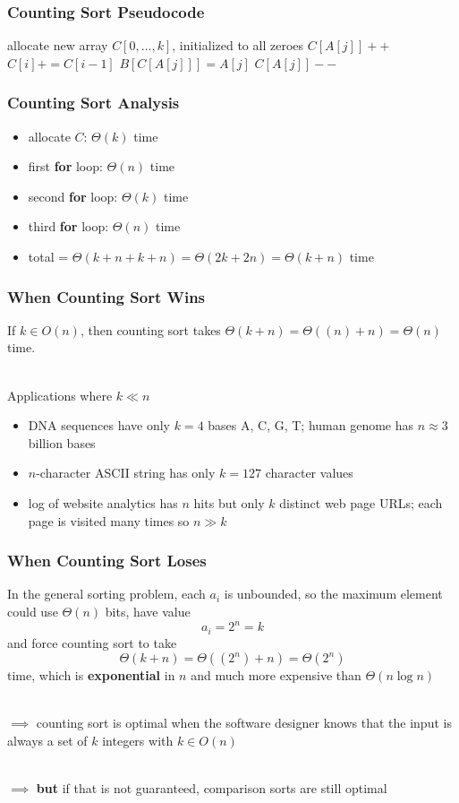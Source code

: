 \documentclass{beamer}
\newcommand{\stanza}{ \\~\ }
\begin{document}
\begin{frame} \frametitle{Counting Sort Pseudocode}
  \begin{algorithmic}[1]
    \State allocate new array $C[0, \ldots, k]$, initialized to all zeroes
      \State $C[A[j]]++$ 
    \EndFor
      \State $C[i] += C[i-1]$ 
    \EndFor
      \State $B[C[A[j]]] = A[j]$
      \State $C[A[j]]--$
    \EndFor
    \EndFunction
  \end{algorithmic}
\end{frame}

\begin{frame} \frametitle{Counting Sort Analysis}
\begin{itemize}
  \item allocate $C$: $\Theta(k)$ time
  \item first \textbf{for} loop: $\Theta(n)$ time
  \item second \textbf{for} loop: $\Theta(k)$ time
  \item third \textbf{for} loop: $\Theta(n)$ time
  \item total = $\Theta(k+n+k+n)=\Theta(2k+2n)=\Theta(k+n)$ time
\end{itemize}
\end{frame}

\begin{frame} \frametitle{When Counting Sort Wins}
  If $k \in O(n)$, then counting sort takes $\Theta(k+n)=\Theta((n)+n)=\Theta(n)$ time. \stanza

Applications where $k \ll n$
\begin{itemize}
\item DNA sequences have only $k=4$ bases A, C, G, T; human genome has $n \approx 3$ billion bases
\item $n$-character ASCII string has only $k=127$ character values
\item log of website analytics has $n$ hits but only $k$ distinct web page URLs;
  each page is visited many times so $n \gg k$
\end{itemize}
\end{frame}

\begin{frame} \frametitle{When Counting Sort Loses}
In the general sorting problem, each $a_i$ is unbounded, so the maximum element
could use $\Theta(n)$ bits, have value
\[ a_i = 2^n = k \]
and force counting sort to take
\[ \Theta(k+n)=\Theta((2^n)+n)=\Theta(2^n) \]
time, which is \textbf{exponential} in $n$ and much more expensive than
$\Theta(n \log n)$ \stanza

$\implies$ counting sort is optimal when the software designer knows that the
input is always a set of $k$ integers with $k \in O(n)$ \stanza

$\implies$ \textbf{but} if that is not guaranteed, comparison sorts are still optimal
\end{frame}
\end{document}
